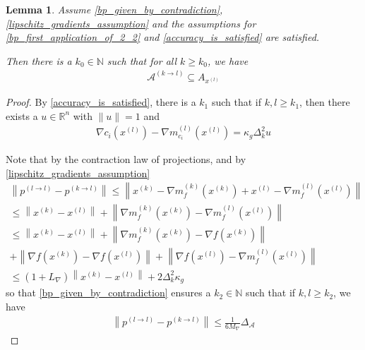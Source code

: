 \documentclass{article}
\newtheorem{lemma}[theorem]{Lemma}
\theoremstyle{case}
\numberwithin{theorem}{subsection}
\newcommand{\dk}{\Delta_k}
\newcommand{\gk}{{\nabla m_f^{(k)}\left(x^{(k)}\right)}}
\newcommand{\gmcik}{{\nabla m_{c_i}^{(k)}\left(\xk\right)}}
\newcommand{\lipgrad}{{L_{\nabla}}}
\newcommand{\maxgrad}{{M_{\nabla}}}
\newcommand{\minactivegraddelta}{{\Delta_{\mathcal A}}}
\newcommand{\naturals}{\mathbb N}
\newcommand{\Rn}{\mathbb R^n}
\newcommand{\xk}{{x^{(k)}}}
\begin{document}
\begin{lemma}
\label{active_models_are_active_p1}
Assume
\cref{bp_given_by_contradiction},
\cref{lipschitz_gradients_assumption}
and the assumptions for 
\cref{bp_first_application_of_2_2}
and \cref{accuracy_is_satisfied}
are satisfied.

Then there is a $k_0 \in \naturals$ such that for all $k \ge k_0$, we have
\begin{align*}
\mathcal A^{(k\to l)} \subseteq A_{x^{(l)}}
\end{align*}
\end{lemma}

\begin{proof}
By \cref{accuracy_is_satisfied}, there is a $k_1$ such that if $k, l \ge k_1$, then there exists a $u \in \Rn$ with $\|u\| = 1$ and 
\begin{align*}
\nabla c_i\left(x^{(l)}\right) - \nabla m_{c_i}^{(l)}\left(x^{(l)}\right) = \kappa_g \dk^2 u
\end{align*}



Note that by the contraction law of projections, and by \cref{lipschitz_gradients_assumption}
\begin{align*}
\left\|p^{(l\to l)} - p^{(k\to l)}\right\| 
\le \left\|\xk - \gk + x^{(l)} - \nabla m_{f}^{(l)}\left(x^{(l)}\right)\right\| \\
\le \left\|\xk - x^{(l)} \right\| + \left\|\gk - \nabla m_{f}^{(l)}\left(x^{(l)}\right)\right\| \\
\le \left\|\xk - x^{(l)} \right\| + \left\|\gk -\nabla f(\xk)\right\| \\
+ \left\|\nabla f\left(\xk\right) - \nabla f\left(x^{(l)}\right)\right\|
+ \left\|\nabla f\left(x^{(l)}\right) - \nabla m_{f}^{(l)}\left(x^{(l)}\right)\right\| \\
\le \left(1 + \lipgrad\right)\left\|\xk - x^{(l)} \right\| + 2 \dk^2 \kappa_g
\end{align*}
so that \cref{bp_given_by_contradiction} ensures a $k_2\in\naturals$ such that if $k, l \ge k_2$, we have
\begin{align}
\left\|p^{(l\to l)} - p^{(k\to l)}\right\| \le \frac 1 {6\maxgrad} \minactivegraddelta \label{bp_aaaaa_p1}
\end{align}



\end{proof}
\end{document}
